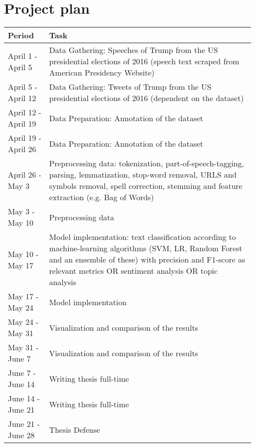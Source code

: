 \documentclass[a4paper,pdf]{article} %
\begin{document}
\section{Project plan}

\begin{center}
\begin{tabular}{ | m{8em} | m{10cm}| } 
  \hline
  \textbf{Period} & \textbf{Task} \\ 
  \hline
  April 1 - April 5 &  Data Gathering: Speeches of Trump from the US presidential elections of 2016 (speech text scraped from American Presidency Website)\\ 
  \hline
  April 5 - April 12 &  Data Gathering: Tweets of Trump from the US presidential elections of 2016 (dependent on the dataset)\\ 
  \hline
  April 12 - April 19 &  Data Preparation: Annotation of the dataset \\
  \hline
  April 19 - April 26 & Data Preparation: Annotation of the dataset\\ 
  \hline
  April 26 - May 3 & Preprocessing data: tokenization, part-of-speech-tagging, parsing, lemmatization, stop-word removal, URLS and symbols removal, spell correction, stemming and feature extraction (e.g. Bag of Words)\\ 
  \hline
  May 3 - May 10 & Preprocessing data \\ 
  \hline
  May 10 - May 17  & Model implementation: text classification according to machine-learning algorithms (SVM, LR, Random Forest and an ensemble of these) with precision and F1-score as relevant metrics OR sentiment analysis OR topic analysis \\ 
  \hline
  May 17 - May 24  & Model implementation \\ 
  \hline
  May 24 - May 31  & Visualization and comparison of the results \\ 
  \hline
  May 31 - June 7  & Visualization and comparison of the results \\ 
  \hline
  June 7 - June 14  & Writing thesis full-time \\ 
  \hline
  June 14 - June 21  & Writing thesis full-time \\ 
  \hline
  June 21 - June 28  & Thesis Defense \\ 
  \hline
\end{tabular}
\end{center}





 
\end{document}
